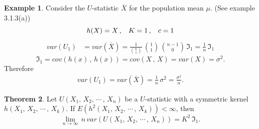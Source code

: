 \documentclass[12pt,a4paper]{report}
\theoremstyle{definition}
\newtheorem{thm}{Theorem}[section]
\newtheorem{exa}[thm]{Example}
\theoremstyle{plain}
\begin{document}
\begin{exa}
Consider the $U$-statistic $\overline{X}$ for the population mean $\mu$. (See example 3.1.3(a))
$$h(X)  = X\,,\hspace{0.3cm} K = 1\, ,\hspace{0.3cm} c = 1$$
\begin{align*}
var(U_1) & = var(\overline{X}) = \frac{1}{\binom{n}{1}}\, \binom{1}{1}\, \binom{n - 1}{0}\, \Im_1 = \frac{1}{n}\, \Im_1
\end{align*}
$$\Im_1 = cov\left(h(x)\, ,\, h(x)\right) = cov\left(X\, , \, X\right) = var(X) = \sigma^2.$$
Therefore
\begin{align*}
var(U_1) = var(\overline{X}) = \frac{1}{n}\, \sigma^2 = \frac{\sigma^2}{n}.
\end{align*}
\end{exa}


\begin{thm}
Let $U(X_1, \, X_2, \, \cdots\, , \, X_n)$ be a $U$-statistic with a symmetric kernel\\ $h(X_1, \, X_2, \, \cdots\, , \, X_k)$. If $E\left(h^2(X_1, \, X_2, \, \cdots\, , \, X_k)\right) < \infty$, then $$\lim_{n\rightarrow\infty}\, n\, var\left(U(X_1, \, X_2, \, \cdots\, , \, X_n)\right) = K^2\, \Im_1.$$
\end{thm}
\end{document}
